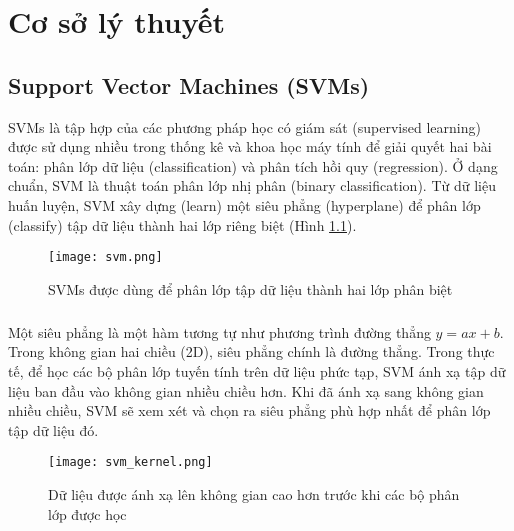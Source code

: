 \chapter{Cơ sở lý thuyết}
\ifpdf
    \graphicspath{{Chapter3/Chapter3Figs/PNG/}{Chapter3/Chapter3Figs/PDF/}{Chapter3/Chapter3Figs/}}
\else
    \graphicspath{{Chapter3/Chapter3Figs/EPS/}{Chapter3/Chapter3Figs/}}
\fi

\section{Support Vector Machines (SVMs)}
SVMs là tập hợp của các phương pháp học có giám sát (supervised learning) được sử dụng nhiều trong thống kê và khoa học máy tính để giải quyết hai bài toán: phân lớp dữ liệu (classification) và phân tích hồi quy (regression). Ở dạng chuẩn, SVM là thuật toán phân lớp nhị phân (binary classification). Từ dữ liệu huấn luyện, SVM xây dựng (learn) một siêu phẳng (hyperplane) để phân lớp (classify) tập dữ liệu thành hai lớp riêng biệt (Hình \ref{fig:svm}).

\begin{figure}[h!]
	\centering
	\captionsetup{width=0.8\textwidth}
	\texttt{[image: svm.png]}
	\caption{SVMs được dùng để phân lớp tập dữ liệu thành hai lớp phân biệt}
    \label{fig:svm}
\end{figure}

\paragraph*{}
Một siêu phẳng là một hàm tương tự như phương trình đường thẳng $y = ax + b$. Trong không gian hai chiều (2D), siêu phẳng chính là đường thẳng. Trong thực tế, để học các bộ phân lớp tuyến tính trên dữ liệu phức tạp, SVM ánh xạ tập dữ liệu ban đầu vào không gian nhiều chiều hơn. Khi đã ánh xạ sang không gian nhiều chiều, SVM sẽ xem xét và chọn ra siêu phẳng phù hợp nhất để phân lớp tập dữ liệu đó. 

\begin{figure}[h!]
	\centering
	\captionsetup{width=0.8\textwidth}
	\texttt{[image: svm\_kernel.png]}
	\caption{Dữ liệu được ánh xạ lên không gian cao hơn trước khi các bộ phân lớp được học}
    \label{fig:svm_kernel}
\end{figure}

